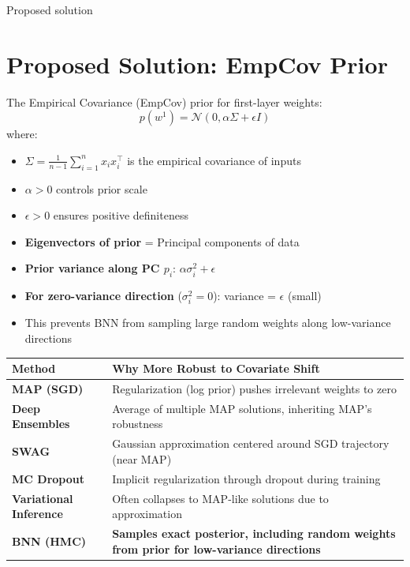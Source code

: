\documentclass[unicode]{beamer}
\numberwithin{equation}{section}
\begin{document}
\begin{frame}{Proposed solution}
    \section{Proposed Solution: EmpCov Prior}

The Empirical Covariance (EmpCov) prior for first-layer weights:
\[
p(w^1) = \mathcal{N}\left(0, \alpha\Sigma + \epsilon I\right)
\]
where:
\begin{itemize}
    \item \( \Sigma = \frac{1}{n-1} \sum_{i=1}^n x_i x_i^\top \) is the empirical covariance of inputs
    \item \( \alpha > 0 \) controls prior scale
    \item \( \epsilon > 0 \) ensures positive definiteness
\end{itemize}

\begin{itemize}
    \item \textbf{Eigenvectors of prior} = Principal components of data
    \item \textbf{Prior variance along PC \( p_i \)}: \( \alpha\sigma_i^2 + \epsilon \)
    \item \textbf{For zero-variance direction} (\( \sigma_i^2 = 0 \)): variance = \( \epsilon \) (small)
    \item This prevents BNN from sampling large random weights along low-variance directions
\end{itemize}
    
\end{frame}





\begin{frame}
\begin{table}[H]
\begin{tabular}{lp{}}
\toprule
\textbf{Method} & \textbf{Why More Robust to Covariate Shift} \\
\midrule
\textbf{MAP (SGD)} & Regularization (log prior) pushes irrelevant weights to zero \\
\textbf{Deep Ensembles} & Average of multiple MAP solutions, inheriting MAP's robustness \\
\textbf{SWAG} & Gaussian approximation centered around SGD trajectory (near MAP) \\
\textbf{MC Dropout} & Implicit regularization through dropout during training \\
\textbf{Variational Inference} & Often collapses to MAP-like solutions due to approximation \\
\midrule
\textbf{BNN (HMC)} & \textbf{Samples exact posterior, including random weights from prior for low-variance directions} \\
\bottomrule
\end{tabular}
\end{table}

\end{frame}
\end{document}

